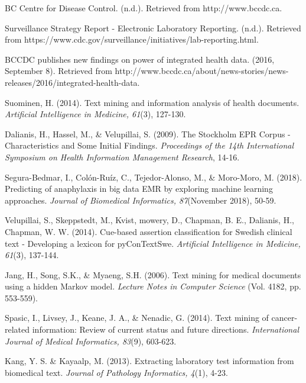 \documentclass[12pt]{article}
\begin{document}
\begin{thebibliography}{99}

BC Centre for Disease Control. (n.d.). Retrieved from http://www.bccdc.ca.

Surveillance Strategy Report - Electronic Laboratory Reporting. (n.d.). Retrieved from https://www.cdc.gov/surveillance/initiatives/lab-reporting.html.

BCCDC publishes new findings on power of integrated health data. (2016, September 8). Retrieved from http://www.bccdc.ca/about/news-stories/news-releases/2016/integrated-health-data.

Suominen, H. (2014). Text mining and information analysis of health documents. \textit{Artificial Intelligence in Medicine, 61}(3), 127-130.

Dalianis, H., Hassel, M., \& Velupillai, S. (2009). The Stockholm EPR Corpus - Characteristics and Some Initial Findings. \textit{Proceedings of the 14th International Symposium on Health Information Management Research}, 14-16.

Segura-Bedmar, I., Colón-Ruíz, C., Tejedor-Alonso, M., \& Moro-Moro, M. (2018). Predicting of anaphylaxis in big data EMR by exploring machine learning approaches. \textit{Journal of Biomedical Informatics, 87}(November 2018), 50-59.

Velupillai, S., Skeppstedt, M., Kvist, mowery, D., Chapman, B. E., Dalianis, H., Chapman, W. W. (2014). Cue-based assertion classification for Swedish clinical text - Developing a lexicon for pyConTextSwe. \textit{Artificial Intelligence in Medicine, 61}(3), 137-144.

Jang, H., Song, S.K., \& Myaeng, S.H. (2006). Text mining for medical documents using a hidden Markov model. \textit{Lecture Notes in Computer Science} (Vol. 4182, pp. 553-559).

Spasic, I., Livsey, J., Keane, J. A., \& Nenadic, G. (2014). Text mining of cancer-related information: Review of current status and future directions. \textit{International Journal of Medical Informatics, 83}(9), 603-623.

Kang, Y. S. \& Kayaalp, M. (2013). Extracting laboratory test information from biomedical text. \textit{Journal of Pathology Informatics, 4}(1), 4-23.


\end{thebibliography}
\end{document}

